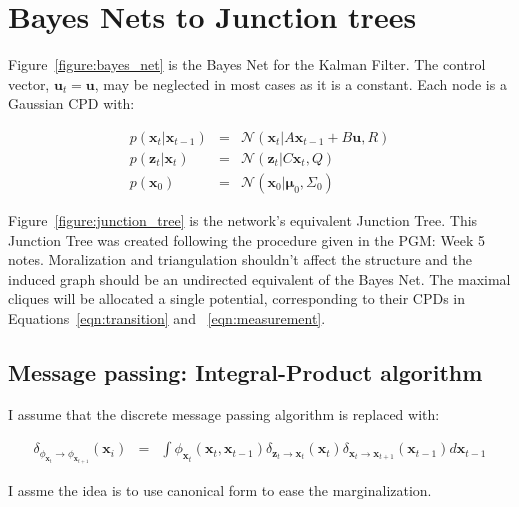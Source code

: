 \chapter{Bayes Nets to Junction trees}

Figure~\ref{figure:bayes_net} is the Bayes Net for the Kalman Filter. The control vector, $\mathbf{u}_t = \mathbf{u}$, may be neglected in most cases as it is a constant. Each node is a Gaussian CPD with:



\begin{eqnarray}
p(\mathbf{x}_t | \mathbf{x}_{t-1}) &=& \mathcal{N}(\mathbf{x}_{t} | A \mathbf{x}_{t-1} + B\mathbf{u}, R) \label{eqn:transition} \\
p(\mathbf{z}_t | \mathbf{x}_{t}) &=& \mathcal{N}(\mathbf{z}_{t} | C\mathbf{x}_{t}, Q) \label{eqn:measurement} \\
p(\mathbf{x}_{0}) &=& \mathcal{N}(\mathbf{x}_{0}| \mathbf{\mu}_{0}, \Sigma_{0}) \label{eqn:belief}
\end{eqnarray}

Figure~\ref{figure:junction_tree} is the network's equivalent Junction Tree. This Junction Tree was created following the procedure given in the PGM: Week 5 notes. Moralization and triangulation shouldn't affect the structure and the induced graph should be an undirected equivalent of the Bayes Net. The maximal cliques will be allocated a single potential, corresponding to their CPDs in Equations~\ref{eqn:transition} and ~\ref{eqn:measurement}.

\section{Message passing: Integral-Product algorithm}

I assume that the discrete message passing algorithm is replaced with:

\begin{eqnarray}
\delta_{\phi_{\mathbf{x}_{t}} \rightarrow \phi_{\mathbf{x}_{t+1}}}(\mathbf{x}_{i}) &=& \int \phi_{\mathbf{x}_{t}}(\mathbf{x}_{t}, \mathbf{x}_{t-1}) \delta_{\mathbf{z}_{t} \rightarrow \mathbf{x}_{t}} (\mathbf{x}_{t}) \delta_{\mathbf{x}_{t} \rightarrow \mathbf{x}_{t+1}} (\mathbf{x}_{t-1}) d\mathbf{x}_{t-1} 
\end{eqnarray}

I assme the idea is to use canonical form to ease the marginalization.
